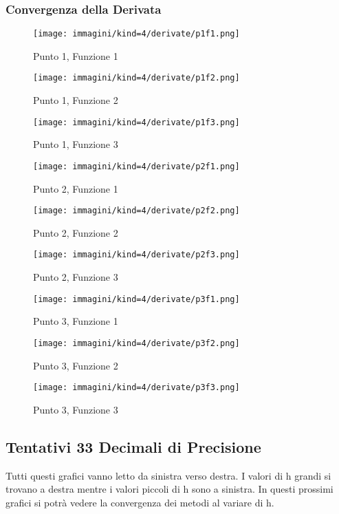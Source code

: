 \documentclass[a4paper]{article}
\begin{document}
{{\subsubsection{Convergenza della Derivata}\label{deriv_graf_4}
\begin{figure}[!ht]
    \centering
    \texttt{[image: immagini/kind=4/derivate/p1f1.png]}
    \caption{Punto 1, Funzione 1}
\end{figure}
\begin{figure}[!ht]
    \centering
    \texttt{[image: immagini/kind=4/derivate/p1f2.png]}
    \caption{Punto 1, Funzione 2}
\end{figure}
\begin{figure}[!ht]
    \centering
    \texttt{[image: immagini/kind=4/derivate/p1f3.png]}
    \caption{Punto 1, Funzione 3}
\end{figure}
\begin{figure}[!ht]
    \centering
    \texttt{[image: immagini/kind=4/derivate/p2f1.png]}
    \caption{Punto 2, Funzione 1}
\end{figure}
\begin{figure}[!ht]
    \centering
    \texttt{[image: immagini/kind=4/derivate/p2f2.png]}
    \caption{Punto 2, Funzione 2}
\end{figure}
\begin{figure}[!ht]
    \centering
    \texttt{[image: immagini/kind=4/derivate/p2f3.png]}
    \caption{Punto 2, Funzione 3}
\end{figure}
\begin{figure}[!ht]
    \centering
    \texttt{[image: immagini/kind=4/derivate/p3f1.png]}
    \caption{Punto 3, Funzione 1}
\end{figure}
\begin{figure}[!ht]
    \centering
    \texttt{[image: immagini/kind=4/derivate/p3f2.png]}
    \caption{Punto 3, Funzione 2}
\end{figure}
\begin{figure}[!ht]
    \centering
    \texttt{[image: immagini/kind=4/derivate/p3f3.png]}
    \caption{Punto 3, Funzione 3}
\end{figure}
\FloatBarrier

\subsection{Tentativi 33 Decimali di Precisione}
Tutti questi grafici vanno letto da sinistra verso destra. I valori di h grandi si trovano a destra mentre i valori piccoli di h sono a sinistra. In questi prossimi grafici si potrà vedere la convergenza dei metodi al variare di h. 
}}
\end{document}

